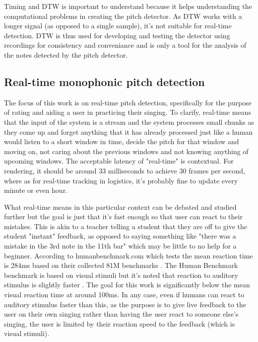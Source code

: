 Timing and DTW is important to understand because it helps understanding the computational problems in creating the pitch detector. As DTW works with a longer signal (as opposed to a single sample), it's not suitable for real-time detection. DTW is thus used for developing and testing the detector using recordings for consistency and conveniance and is only a tool for the analysis of the notes detected by the pitch detector. 

\subsection{Real-time monophonic pitch detection}
The focus of this work is on real-time pitch detection, specifically for the purpose of rating and aiding a user in practicing their singing. To clarify, real-time means that the input of the system is a stream and the system processes small chunks as they come up and forget anything that it has already processed just like a human would listen to a short window in time, decide the pitch for that window and moving on, not caring about the previous windows and not knowing anything of upcoming windows. The acceptable latency of "real-time" is contextual. For rendering, it should be around 33 milliseconds to achieve 30 frames per second, where as for real-time tracking in logistics, it's probably fine to update every minute or even hour. 

What real-time means in this particular context can be debated and studied further but the goal is just that it's fast enough so that user can react to their mistakes. This is akin to a teacher telling a student that they are off to give the student "instant" feedback, as opposed to saying something like "there was a mistake in the 3rd note in the 11th bar" which may be little to no help for a beginner. According to humanbenchmark.com which tests the mean reaction time is 284ms based on their collected 81M benchmarks \cite{HumanBenchmark2025}. The Human Benchmark benchmark is based on visual stimuli but it's noted that reaction to auditory stimulus is slightly faster \cite{SheltonKumar2010}. The goal for this work is significantly below the mean visual reaction time at around 100ms. In any case, even if humans can react to auditory stimulus faster than this, as the purpose is to give live feedback to the user on their own singing rather than having the user react to someone else's singing, the user is limited by their reaction speed to the feedback (which is visual stimuli).

